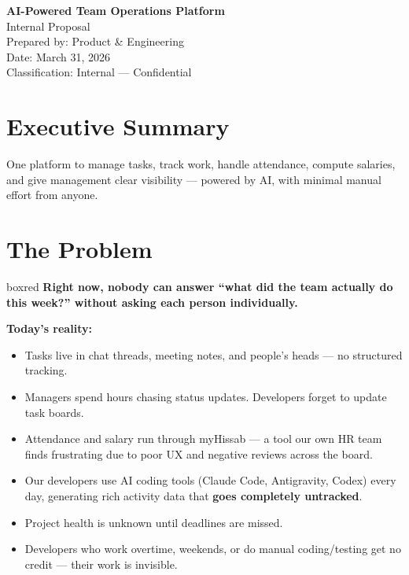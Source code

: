 \documentclass[12pt,a4paper]{article}
\begin{document}
\begin{center}
    \vspace*{3cm}
    {\LARGE\bfseries AI-Powered Team Operations Platform}\\[0.8cm]
    {\large Internal Proposal}\\[2cm]
    {\color{muted}
    Prepared by: Product \& Engineering\\[0.3cm]
    Date: March 31, 2026\\[0.3cm]
    Classification: Internal --- Confidential}
    \vspace*{3cm}
\end{center}

\newpage
\tableofcontents
\newpage

\section{Executive Summary}

One platform to manage tasks, track work, handle attendance, compute salaries, and give management clear visibility --- powered by AI, with minimal manual effort from anyone.

\section{The Problem}

\begin{hookbox}{boxred}
\textbf{Right now, nobody can answer ``what did the team actually do this week?'' without asking each person individually.}
\end{hookbox}

\textbf{Today's reality:}

\begin{itemize}[nosep]
    \item Tasks live in chat threads, meeting notes, and people's heads --- no structured tracking.
    \item Managers spend hours chasing status updates. Developers forget to update task boards.
    \item Attendance and salary run through myHissab --- a tool our own HR team finds frustrating due to poor UX and negative reviews across the board.
    \item Our developers use AI coding tools (Claude Code, Antigravity, Codex) every day, generating rich activity data that \textbf{goes completely untracked}.
    \item Project health is unknown until deadlines are missed.
    \item Developers who work overtime, weekends, or do manual coding/testing get no credit --- their work is invisible.
\end{itemize}
\end{document}
